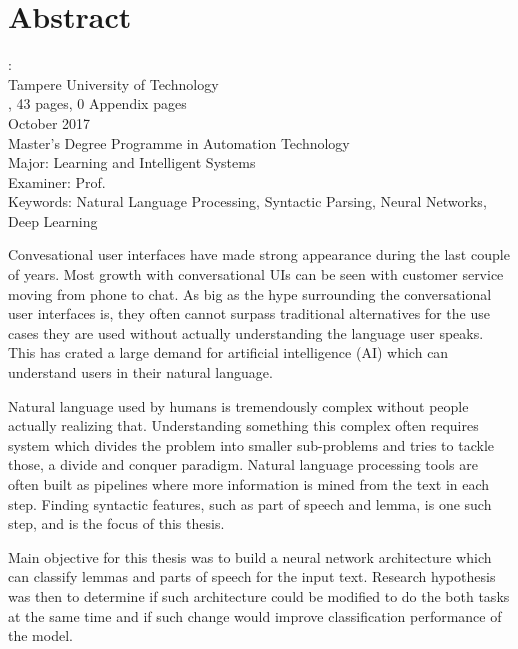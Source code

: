 \documentclass[12pt,a4paper,english
]{tutthesis}
\begin{document}
\chapter*{Abstract}

\begin{spacing}{1.0}
         {\bf \textsf{\MakeUppercase{\@author}}}: \@title\\   %
         \textsf{Tampere University of Technology}\\
         \textsf{\@thesistype, 43 pages, 0 Appendix pages} \\
         \textsf{October 2017}\\
         \textsf{Master's Degree Programme in Automation Technology}\\
         \textsf{Major: Learning and Intelligent Systems}\\
         \textsf{Examiner: Prof. \@examiner}\\ %
         \textsf{Keywords: Natural Language Processing, Syntactic Parsing, Neural Networks, Deep Learning}\\
\end{spacing}

Convesational user interfaces have made strong appearance during the last couple of years. Most growth with conversational UIs can be seen with customer service moving from phone to chat. As big as the hype surrounding the conversational user interfaces is, they often cannot surpass traditional alternatives for the use cases they are used without actually understanding the language user speaks. This has crated a large demand for artificial intelligence (AI) which can understand users in their natural language.

Natural language used by humans is tremendously complex without people actually realizing that. Understanding something this complex often requires system which divides the problem into smaller sub-problems and tries to tackle those, a divide and conquer paradigm. Natural language processing tools are often built as pipelines where more information is mined from the text in each step. Finding syntactic features, such as part of speech and lemma,  is one such step, and is the focus of this thesis.

Main objective for this thesis was to build a neural network architecture which can classify lemmas and parts of speech for the input text. Research hypothesis was then to determine if such architecture could be modified to do the both tasks at the same time and if such change would improve classification performance of the model.
\end{document}
